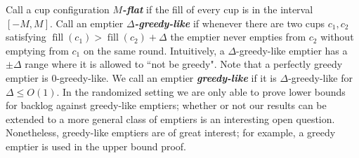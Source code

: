 \documentclass[twocolumn]{article}[10pt]
\newcommand{\defn}[1]{{\textit{\textbf{\boldmath #1}}}\xspace}
\DeclareMathOperator{\fil}{\text{fill}}
\begin{document}
Call a cup configuration $M$\defn{-flat} if the fill of every cup is in the
interval $[-M, M]$. Call an emptier $\Delta$\defn{-greedy-like} if whenever
there are two cups $c_1, c_2$ satisfying $\fil(c_1) > \fil(c_2) +
\Delta$ the emptier never empties from $c_2$ without emptying from $c_1$ on the
same round. Intuitively, a $\Delta$-greedy-like emptier has a $\pm \Delta$
range where it is allowed to ``not be greedy". Note that a perfectly greedy
emptier is $0$-greedy-like. We call an emptier \defn{greedy-like} if it is
$\Delta$-greedy-like for $\Delta \le O(1)$.
In the randomized setting we are only able to prove lower bounds for backlog
against greedy-like emptiers; whether or not our results can be extended to a
more general class of emptiers is an interesting open question. 
Nonetheless, greedy-like emptiers are of great interest; for example, a greedy
emptier is used in the upper bound proof.  
\end{document}
